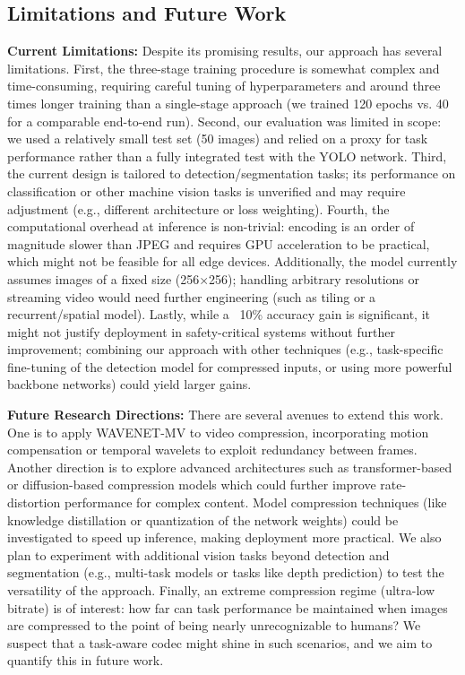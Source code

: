 \documentclass[conference]{IEEEtran}
\begin{document}
\subsection{Limitations and Future Work}

\textbf{Current Limitations:} Despite its promising results, our approach has several limitations. First, the three-stage training procedure is somewhat complex and time-consuming, requiring careful tuning of hyperparameters and around three times longer training than a single-stage approach (we trained 120 epochs vs. 40 for a comparable end-to-end run). Second, our evaluation was limited in scope: we used a relatively small test set (50 images) and relied on a proxy for task performance rather than a fully integrated test with the YOLO network. Third, the current design is tailored to detection/segmentation tasks; its performance on classification or other machine vision tasks is unverified and may require adjustment (e.g., different architecture or loss weighting). Fourth, the computational overhead at inference is non-trivial: encoding is an order of magnitude slower than JPEG and requires GPU acceleration to be practical, which might not be feasible for all edge devices. Additionally, the model currently assumes images of a fixed size (256×256); handling arbitrary resolutions or streaming video would need further engineering (such as tiling or a recurrent/spatial model). Lastly, while a ~10\% accuracy gain is significant, it might not justify deployment in safety-critical systems without further improvement; combining our approach with other techniques (e.g., task-specific fine-tuning of the detection model for compressed inputs, or using more powerful backbone networks) could yield larger gains.

\textbf{Future Research Directions:} There are several avenues to extend this work. One is to apply WAVENET-MV to video compression, incorporating motion compensation or temporal wavelets to exploit redundancy between frames. Another direction is to explore advanced architectures such as transformer-based or diffusion-based compression models which could further improve rate-distortion performance for complex content. Model compression techniques (like knowledge distillation or quantization of the network weights) could be investigated to speed up inference, making deployment more practical. We also plan to experiment with additional vision tasks beyond detection and segmentation (e.g., multi-task models or tasks like depth prediction) to test the versatility of the approach. Finally, an extreme compression regime (ultra-low bitrate) is of interest: how far can task performance be maintained when images are compressed to the point of being nearly unrecognizable to humans? We suspect that a task-aware codec might shine in such scenarios, and we aim to quantify this in future work.
\end{document}
